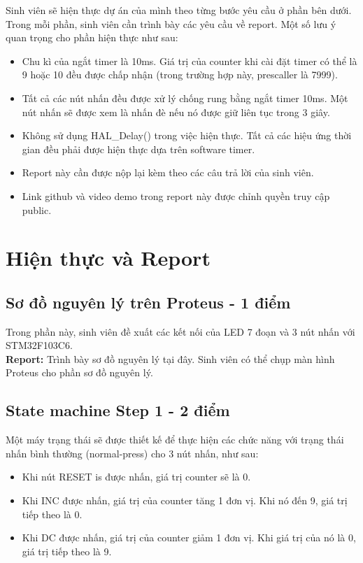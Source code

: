 Sinh viên sẽ hiện thực dự án của mình theo từng bước yêu cầu ở phần bên dưới. Trong mỗi phần, sinh viên cần trình bày các yêu cầu về report. Một số lưu ý quan trọng cho phần hiện thực như sau:

\begin{itemize}
    \item Chu kì của ngắt timer là 10ms. Giá trị của counter khi cài đặt timer có thể là 9 hoặc 10 đều được chấp nhận (trong trường hợp này, prescaller là 7999).
    \item Tất cả các nút nhấn đều được xử lý chống rung bằng ngắt timer 10ms. Một nút nhấn sẽ được xem là nhấn đè nếu nó được giữ liên tục trong 3 giây.
    \item Không sử dụng HAL\_Delay() trong việc hiện thực. Tất cả các hiệu ứng thời gian đều phải được hiện thực dựa trên software timer.
    \item Report này cần được nộp lại kèm theo các câu trả lời của sinh viên.
    \item Link github và video demo trong report này được chỉnh quyền truy cập public.
\end{itemize}

\section{Hiện thực và Report}

\subsection{Sơ đồ nguyên lý trên Proteus - 1 điểm}
Trong phần này, sinh viên đề xuất các kết nối của LED 7 đoạn và 3 nút nhấn với STM32F103C6.\\

\textbf{Report: } Trình bày sơ đồ nguyên lý tại đây. Sinh viên có thể chụp màn hình Proteus cho phần sơ đồ nguyên lý.\\


\subsection{State machine Step 1 - 2 điểm}
Một máy trạng thái sẽ được thiết kế để thực hiện các chức năng với trạng thái nhấn bình thường (normal-press) cho 3 nút nhấn, như sau:
\begin{itemize}
    \item Khi nút RESET is được nhấn, giá trị counter sẽ là 0.
    \item Khi INC được nhấn, giá trị của counter tăng 1 đơn vị. Khi nó đến 9, giá trị tiếp theo là 0.
    \item Khi DC được nhấn, giá trị của counter giảm 1 đơn vị. Khi giá trị của nó là 0, giá trị tiếp theo là 9.
\end{itemize}

